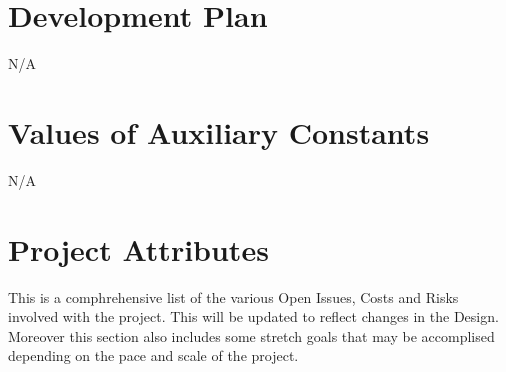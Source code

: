 \documentclass[12pt]{article}
\begin{document}
\section{Development Plan}
N/A

\section{Values of Auxiliary Constants}
N/A


\section{Project Attributes}
This is a comphrehensive list of the various Open Issues, Costs and Risks involved with the project. This will be updated to reflect changes in the Design. Moreover this section also includes some stretch goals that may be accomplised depending on the pace and scale of the project.
\end{document}
